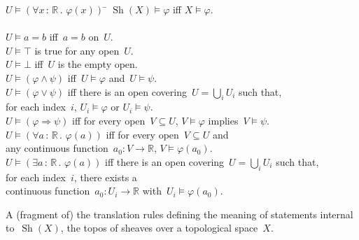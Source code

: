 \documentclass[oneside,reqno]{amsart}
\theoremstyle{definition}
\theoremstyle{plain}
\theoremstyle{remark}
\newcommand{\RR}{\mathbb{R}}
\DeclareMathOperator{\Sh}{Sh}
\renewcommand{\_}{\mathpunct{.}\,}
\newcommand{\?}{\,{:}\,}
\begin{document}
\begin{table}
  \begin{tabbing}
    $U \models (\forall x\?\RR\_ \varphi(x))$ \= \kill
    $\Sh(X) \models \varphi$ \> iff $X \models \varphi$. \\\\
    $U \models a = b$ \> iff~$a = b$ on~$U$. \\
    $U \models \top$ \> is true for any open~$U$. \\
    $U \models \bot$ \> iff~$U$ is the empty open. \\
    $U \models (\varphi \wedge \psi)$ \> iff~$U \models \varphi$ and~$U \models \psi$. \\
    $U \models (\varphi \vee \psi)$ \> iff there is an open covering~$U =
    \bigcup_i U_i$ such that, \\ \> \qquad for each index~$i$, $U_i \models \varphi$
    or $U_i \models \psi$. \\
    $U \models (\varphi \Rightarrow \psi)$ \> iff for every open~$V \subseteq U$,
    $V \models \varphi$ implies~$V \models \psi$. \\
    $U \models (\forall a\?\RR\_ \varphi(a))$ \> iff for every open~$V
    \subseteq U$ and \\\>\qquad any continuous function~$a_0 : V \to \RR$, $V \models
    \varphi(a_0)$. \\
    $U \models (\exists a\?\RR\_ \varphi(a))$ \> iff there is an open
    covering~$U = \bigcup_i U_i$ such that, \\ \> \qquad for each index~$i$,
    there exists a \\\>\qquad continuous function~$a_0 : U_i \to \RR$ with~$U_i \models
    \varphi(a_0)$.
  \end{tabbing}

  \caption{\label{table:sheaf} A (fragment of) the translation rules defining
  the meaning of statements internal to~$\Sh(X)$, the topos of sheaves over a
  topological space~$X$.}
\end{table}
\end{document}
